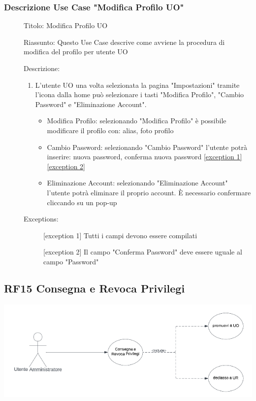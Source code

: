 \documentclass{article}
\begin{document}
\subsubsection*{Descrizione Use Case "Modifica Profilo UO"}
\begin{description}
    \item[] Titolo: Modifica Profilo UO
    \item[] Riassunto: Questo Use Case descrive come avviene la procedura di modifica del profilo per utente UO
    \item[] Descrizione:
        \begin{enumerate}
            \item L'utente UO una volta selezionata la pagina "Impostazioni" tramite l'icona  dalla home può selezionare i tasti "Modifica Profilo", "Cambio Password" e "Eliminazione Account".
                  \begin{itemize}
                      \item Modifica Profilo: selezionando "Modifica Profilo" è possibile modificare il profilo con: alias, foto profilo
                      \item Cambio Password: selezionando "Cambio Password" l'utente potrà inserire: nuova password, conferma nuova password \hyperref[exc:13.1]{[exception 1]}\hyperref[exc:13.2]{[exception 2]}
                      \item Eliminazione Account: selezionando "Eliminazione Account" l'utente potrà eliminare il proprio account. È necessario confermare cliccando su un pop-up
                  \end{itemize}
        \end{enumerate}
    \item[] Exceptions:
        \begin{description}
            \item[] \label{exc:13.1} [exception 1] Tutti i campi devono essere compilati
            \item[] \label{exc:13.2} [exception 2] Il campo "Conferma Password" deve essere uguale al campo "Password"
        \end{description}
\end{description}
\clearpage
\subsection{RF15 Consegna e Revoca Privilegi}
\begin{center}
    \item[] \includegraphics[scale=0.5]{UseCase_5.png}
\end{center}
\end{document}
